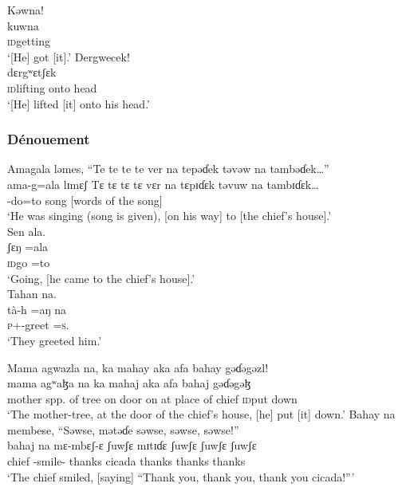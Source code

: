 \ea  Kəwna! \\
 \gll kuwna\\
 \textsc{id}getting  \\
 \glt ‘[He] got [it].’ 
 \z
\ea  Dergwecek!\\
 \gll dɛrgʷɛtʃɛk\\
 {\textsc{id}lifting onto head}\\
 \glt ‘[He] lifted [it] onto his head.’
 \z
 \subsubsection*{Dénouement}
\ea  Amagala  ləmes,  {“Te te te te ver na tepəɗek təvəw na tambəɗek…”}\\
 \gll ama-g=ala    lɪmɛʃ  {Tɛ tɛ tɛ tɛ vɛr na tɛpɪɗɛk təvuw na tambɪɗɛk…}\\
 {{\DEP}-do=to}  song  {[words of the song]}\\
 \glt ‘He was singing (song is given), [on his way] to [the chief’s house].’\\
 \z
\ea  Sen  ala.  \\
 \gll ʃɛŋ      =ala\\
 \textsc{id}go        =to\\
 \glt ‘Going, [he came to the chief’s house].’  \\
 \z
\ea  Tahan  na.\\
 \gll tà-h    =aŋ      na\\
 \textsc{p}+{\PFV}-greet =\textsc{s}.{\IO}   {\PSP}\\
 \glt ‘They greeted him.’
 \z
 
\ea Mama  agwazla  na,  ka  mahay  aka  afa  bahay  gəɗəgəzl!         \\
 \gll mama  agʷaɮa     na  ka   mahaj   aka   afa       bahaj  gəɗəgəɮ \\
 mother  {spp. of tree}   {\PSP}  on     door        on      {at place of}     chief   {\textsc{id}put down}\\
 \glt ‘The mother-tree,  at the door of the chief’s house, [he] put [it] down.’  
 \z
\ea  Bahay  na  membese,  “Səwse,   mətəɗe   səwse, səwse, səwse!”\\
 \gll bahaj      na  mɛ-mbɛʃ-ɛ  ʃuwʃɛ   mɪtɪɗɛ   ʃuwʃɛ  ʃuwʃɛ  ʃuwʃɛ\\
 chief  {\PSP}  {\NOM}-smile{}-{\CL}  thanks   cicada   thanks   thanks    thanks\\
 \glt ‘The chief smiled, [saying] “Thank you, thank you, thank you cicada!”’
 \z
 
